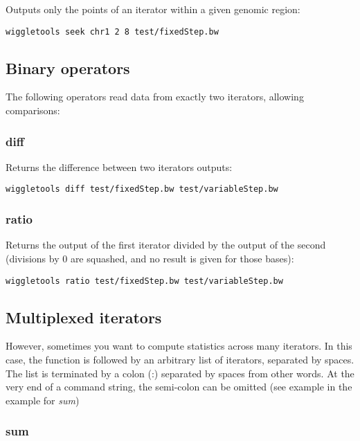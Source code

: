 \documentclass[12pt]{article}
\begin{document}
Outputs only the points of an iterator within a given genomic region:

\begin{verbatim}
wiggletools seek chr1 2 8 test/fixedStep.bw 
\end{verbatim}

\subsection{Binary operators}

The following operators read data from exactly two iterators, allowing comparisons:

\subsubsection{diff}

Returns the difference between two iterators outputs:

\begin{verbatim}
wiggletools diff test/fixedStep.bw test/variableStep.bw 
\end{verbatim}

\subsubsection{ratio}

Returns the output of the first iterator divided by the output of the second (divisions by 0 are squashed, and no result is given for those bases):

\begin{verbatim}
wiggletools ratio test/fixedStep.bw test/variableStep.bw 
\end{verbatim}

\subsection{Multiplexed iterators}

However, sometimes you want to compute statistics across many iterators. In this case, the function is followed by an arbitrary list of iterators, separated by spaces. The list is terminated by a colon (:) separated by spaces from other words. At the very end of a command string, the semi-colon can be omitted (see example in the example for \emph{sum})

\subsubsection{sum}
\end{document}
